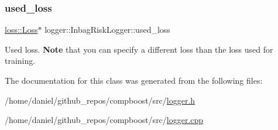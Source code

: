 \subsubsection{\texorpdfstring{used\+\_\+loss}{used\_loss}}
{\footnotesize\ttfamily \hyperlink{classloss_1_1_loss}{loss\+::\+Loss}$\ast$ logger\+::\+Inbag\+Risk\+Logger\+::used\+\_\+loss\hspace{0.3cm}{\ttfamily [private]}}



Used loss. {\bfseries Note} that you can specify a different loss than the loss used for training. 



The documentation for this class was generated from the following files\+:\begin{DoxyCompactItemize}
\item 
/home/daniel/github\+\_\+repos/compboost/src/\hyperlink{logger_8h}{logger.\+h}\item 
/home/daniel/github\+\_\+repos/compboost/src/\hyperlink{logger_8cpp}{logger.\+cpp}\end{DoxyCompactItemize}
